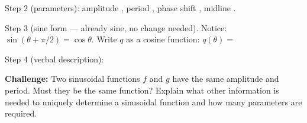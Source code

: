 \documentclass[10pt]{article}
\begin{document}
\begin{tcolorbox}[colback=white, colframe=black!40,
    title=\textbf{Tier E --- Extend},
    fonttitle=\bfseries, arc=2mm, left=3mm, right=3mm, top=2mm, bottom=2mm]
\vspace{4pt}
Step 2 (parameters): amplitude \underline{\hspace{1.5cm}}, period \underline{\hspace{1.5cm}},
phase shift \underline{\hspace{2cm}}, midline \underline{\hspace{1.5cm}}.

\vspace{4pt}
Step 3 (sine form --- already sine, no change needed). Notice: $\sin(\theta + \pi/2) = \cos\theta$.
Write $q$ as a cosine function:
$q(\theta) = $ \underline{\hspace{5cm}}

\vspace{4pt}
Step 4 (verbal description): 

\vspace{6pt}
\textbf{Challenge:} Two sinusoidal functions $f$ and $g$ have the same amplitude and
period. Must they be the same function? Explain what other information is needed to
uniquely determine a sinusoidal function and how many parameters are required.


\end{tcolorbox}
\end{document}
